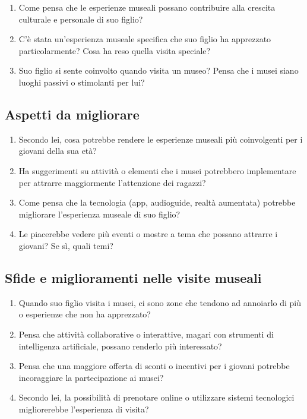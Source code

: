 \documentclass[a4paper, 12pt]{article}
\begin{document}
\begin{enumerate}
    \item Come pensa che le esperienze museali possano contribuire alla crescita culturale e personale di suo figlio?
    \item C'è stata un'esperienza museale specifica che suo figlio ha apprezzato particolarmente? Cosa ha reso quella visita speciale?
    \item Suo figlio si sente coinvolto quando visita un museo? Pensa che i musei siano luoghi passivi o stimolanti per lui?
\end{enumerate}

\subsection{\textcolor{subsectioncolor}{Aspetti da migliorare}}

\begin{enumerate}
    \item Secondo lei, cosa potrebbe rendere le esperienze museali più coinvolgenti per i giovani della sua età?
    \item Ha suggerimenti su attività o elementi che i musei potrebbero implementare per attrarre maggiormente l'attenzione dei ragazzi?
    \item Come pensa che la tecnologia (app, audioguide, realtà aumentata) potrebbe migliorare l'esperienza museale di suo figlio?
    \item Le piacerebbe vedere più eventi o mostre a tema che possano attrarre i giovani? Se sì, quali temi?
\end{enumerate}

\subsection{\textcolor{subsectioncolor}{Sfide e miglioramenti nelle visite museali}}

\begin{enumerate}
    \item Quando suo figlio visita i musei, ci sono zone che tendono ad annoiarlo di più o esperienze che non ha apprezzato? 
    \item Pensa che attività collaborative o interattive, magari con strumenti di intelligenza artificiale, possano renderlo più interessato?
    \item Pensa che una maggiore offerta di sconti o incentivi per i giovani potrebbe incoraggiare la partecipazione ai musei?
    \item Secondo lei, la possibilità di prenotare online o utilizzare sistemi tecnologici migliorerebbe l’esperienza di visita?
\end{enumerate}
\end{document}
